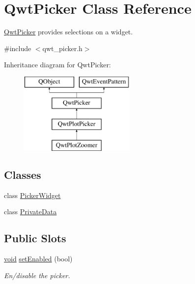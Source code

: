 \hypertarget{class_qwt_picker}{\section{Qwt\-Picker Class Reference}
\label{class_qwt_picker}
}


\hyperlink{class_qwt_picker}{Qwt\-Picker} provides selections on a widget.  




{\ttfamily \#include $<$qwt\-\_\-picker.\-h$>$}

Inheritance diagram for Qwt\-Picker\-:\begin{figure}[H]
\begin{center}
\leavevmode
\includegraphics[height=4.000000cm]{class_qwt_picker}
\end{center}
\end{figure}
\subsection*{Classes}
\begin{DoxyCompactItemize}
\item 
class \hyperlink{class_qwt_picker_1_1_picker_widget}{Picker\-Widget}
\item 
class \hyperlink{class_qwt_picker_1_1_private_data}{Private\-Data}
\end{DoxyCompactItemize}
\subsection*{Public Slots}
\begin{DoxyCompactItemize}
\item 
\hyperlink{group___u_a_v_objects_plugin_ga444cf2ff3f0ecbe028adce838d373f5c}{void} \hyperlink{class_qwt_picker_aa590756369efae6ebf323302a0af5d36}{set\-Enabled} (bool)
\begin{DoxyCompactList}\small\item\em En/disable the picker. \end{DoxyCompactList}\end{DoxyCompactItemize}
